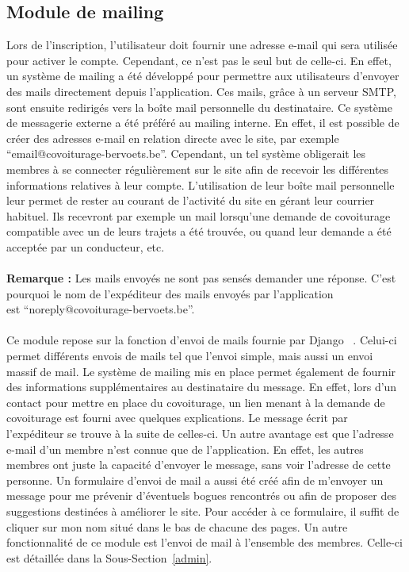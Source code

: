 \documentclass[12pt, a4paper, oneside]{article}
\begin{document}
\subsection{Module de mailing} \label{mail}
    Lors de l'inscription, l'utilisateur doit fournir une adresse e-mail qui sera utilisée pour activer le compte. Cependant, ce n'est pas le seul but de celle-ci. En effet, un système de mailing a été développé pour permettre aux utilisateurs d'envoyer des mails directement depuis l'application. Ces mails, grâce à un serveur SMTP, sont ensuite redirigés vers la boîte mail personnelle du destinataire. Ce système de messagerie externe a été préféré au mailing interne. En effet, il est possible de créer des adresses e-mail en relation directe avec le site, par exemple ``email@covoiturage-bervoets.be''. Cependant, un tel système obligerait les membres à se connecter régulièrement sur le site afin de recevoir les différentes informations relatives à leur compte. L'utilisation de leur boîte mail personnelle leur permet de rester au courant de l'activité du site en gérant leur courrier habituel. Ils recevront par exemple un mail lorsqu'une demande de covoiturage compatible avec un de leurs trajets a été trouvée, ou quand leur demande a été acceptée par un conducteur, etc.\\\\
    \textbf{Remarque :} Les mails envoyés ne sont pas sensés demander une réponse. C'est pourquoi le nom de l'expéditeur des mails envoyés par l'application \\est ``noreply@covoiturage-bervoets.be''.\\\\
    \indent Ce module repose sur la fonction d'envoi de mails fournie par Django ~\cite{django-mail}. Celui-ci permet différents envois de mails tel que l'envoi simple, mais aussi un envoi massif de mail.
    Le système de mailing mis en place permet également de fournir des informations supplémentaires au destinataire du message. En effet, lors d'un contact pour mettre en place du covoiturage, un lien menant à la demande de covoiturage est fourni avec quelques explications. Le message écrit par l'expéditeur se trouve à la suite de celles-ci. Un autre avantage est que l'adresse e-mail d'un membre n'est connue que de l'application. En effet, les autres membres ont juste la capacité d'envoyer le message, sans voir l'adresse de cette personne. Un formulaire d'envoi de mail a aussi été créé afin de m'envoyer un message pour me prévenir d'éventuels bogues rencontrés ou afin de proposer des suggestions destinées à améliorer le site. Pour accéder à ce formulaire, il suffit de cliquer sur mon nom situé dans le bas de chacune des pages. Un autre fonctionnalité de ce module est l'envoi de mail à l'ensemble des membres. Celle-ci est détaillée dans la Sous-Section~\ref{admin}.\\\\
\end{document}
